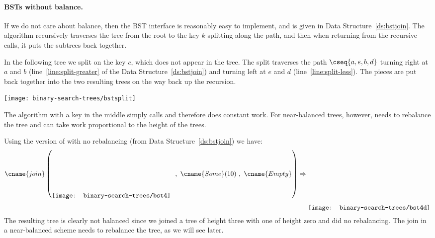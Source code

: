 \paragraph{BSTs without balance.}
If we do not care about balance, then the BST interface is reasonably easy
to implement, and is given in Data Structure~\ref{ds:bstjoin}.    
The  algorithm recursively traverses the tree from the
root to the key $k$ splitting along the path, and then when returning from
the recursive calls, it puts the subtrees back together.
\begin{example}
In the following tree we split on the key $c$, which does not appear
in the tree.  The split traverses
the path $\cseq{a,e,b,d}$ turning right at $a$ and $b$
(line~\ref{line:split-greater} of the Data Structure~\ref{ds:bstjoin})
and turning left at $e$ and $d$ (line~\ref{line:split-less}).  The
pieces are put back together into the two resulting trees on the way
back up the recursion.  
\begin{center}
  \texttt{[image: binary-search-trees/bstsplit]}
\end{center}
\end{example}
The  algorithm with a key in the middle simply calls
 and therefore does constant work.  For near-balanced
trees, however,  needs to rebalance the tree and can take
work proportional to the height of the trees.

\begin{example}
Using the version of  with no rebalancing (from Data Structure~\ref{ds:bstjoin})
we have:
\[\cname{join}\left(
\raisebox{-.45in}{\texttt{[image: binary-search-trees/bst4]}}~~,
~\cname{Some}(10)~,
~\cname{Empty}
\right) \Rightarrow 
\raisebox{-.7in}{\texttt{[image: binary-search-trees/bst4d]}}
\]
The resulting tree is clearly not balanced since we joined a tree of
height three with one of height zero and did no rebalancing.  The join
in a near-balanced scheme needs to rebalance the tree, as we will see
later.
\end{example}

